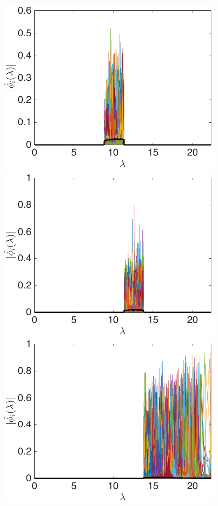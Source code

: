 \documentclass{article}
\begin{document}
\begin{figure}[bth]
\begin{minipage}[m]{0.16\linewidth}
\end{minipage}
\begin{minipage}[m]{0.16\linewidth}
\centerline{\includegraphics[width=.8\linewidth]{fig_bunny_freq_wav2a}}
\end{minipage}
\begin{minipage}[m]{0.16\linewidth}
\centerline{\includegraphics[width=.8\linewidth]{fig_bunny_freq_wav3a}}
\end{minipage}
\begin{minipage}[m]{0.16\linewidth}
\centerline{\includegraphics[width=.8\linewidth]{fig_bunny_freq_wav4a}}

\end{minipage}
\end{figure}
\end{document}
